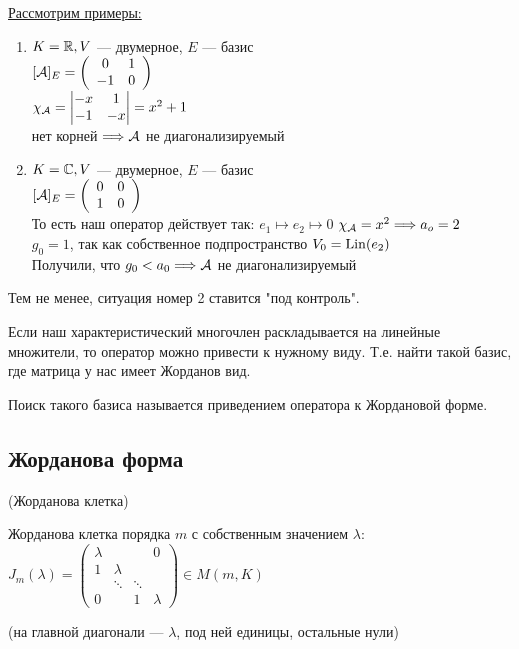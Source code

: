 \underline{Рассмотрим примеры:}
\begin{enumerate}
    \item $ K = \mathbb{R}, V$ --- двумерное, $E$ --- базис \\
    $ [\mathcal{A}]_{E} = \left(\begin{array}{cc}
    0 & 1 \\ 
    -1 & 0
    \end{array}\right)$ \\
    $ \chi_{\A} =
    \begin{vmatrix*}
        -x & 1 \\
        -1 & -x
    \end{vmatrix*} = x^2 + 1$ \\
    нет корней $ \Longrightarrow \mathcal{A}$ не диагонализируемый

    \item $ K = \mathbb{C}, V$ --- двумерное, $E$ --- базис \\
    $ [\mathcal{A}]_{E} = \left(\begin{array}{cc}
        0 & 0 \\ 
        1 & 0
    \end{array}\right)$ \\
    То есть наш оператор действует так: $e_1 \mapsto e_2 \mapsto 0$
    $\chi_{\mathcal{A}} = x^2 \Longrightarrow a_o = 2$ \\
    $g_0 = 1$, так как собственное подпространство $V_0 = \operatorname{Lin} (e_2)$ \\
    Получили, что $g_0 < a_0 \Longrightarrow \mathcal{A}$ не диагонализируемый
\end{enumerate}

\vspace*{5mm}

Тем не менее, ситуация номер 2 ставится "под контроль".

Если наш характеристический многочлен раскладывается на линейные множители, то оператор можно привести к нужному виду. Т.е. найти такой базис, где матрица у нас имеет Жорданов вид.

Поиск такого базиса называется приведением оператора к Жордановой форме.

\subsection{Жорданова форма}

\begin{conj}(Жорданова клетка)

    Жорданова клетка порядка $ m $ с собственным значением $ \lambda $: \\
    $ J_m(\lambda) = \left(\begin{array}{cccc}
    \lambda &  &  & 0 \\ 
    1 & \lambda &  &  \\ 
     & \ddots & \ddots &  \\ 
    0 &  & 1 & \lambda
    \end{array}\right) \in M(m, K) $
    
    (на главной диагонали --- $\lambda$, под ней единицы, остальные нули)
\end{conj}

